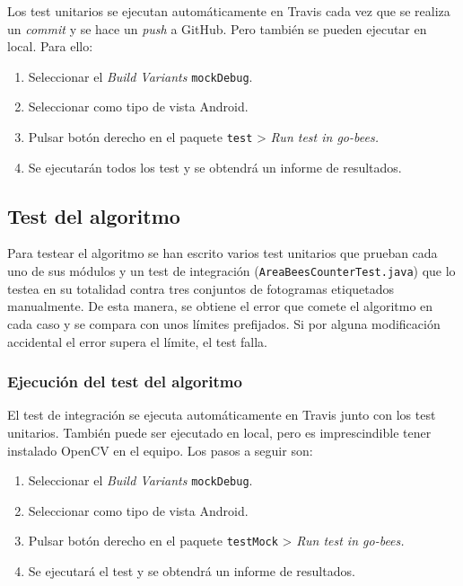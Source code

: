 Los test unitarios se ejecutan automáticamente en Travis cada vez que se
realiza un \emph{commit} y se hace un \emph{push} a GitHub. Pero también
se pueden ejecutar en local. Para ello:

\begin{enumerate}
\def\labelenumi{\arabic{enumi}.}
\tightlist
\item
  Seleccionar el \emph{Build Variants} \texttt{mockDebug}.
\item
  Seleccionar como tipo de vista Android.
\item
  Pulsar botón derecho en el paquete \texttt{test} \textgreater{}
  \emph{Run test in go-bees.}
\item
  Se ejecutarán todos los test y se obtendrá un informe de resultados.
\end{enumerate}


\subsection{Test del algoritmo}\label{test-del-algoritmo}

Para testear el algoritmo se han escrito varios test unitarios que
prueban cada uno de sus módulos y un test de integración
(\texttt{AreaBeesCounterTest.java}) que lo testea en su totalidad contra
tres conjuntos de fotogramas etiquetados manualmente. De esta manera, se
obtiene el error que comete el algoritmo en cada caso y se compara con
unos límites prefijados. Si por alguna modificación accidental el error
supera el límite, el test falla.

\subsubsection{Ejecución del test del
algoritmo}\label{ejecucion-del-test-del-algoritmo}

El test de integración se ejecuta automáticamente en Travis junto con
los test unitarios. También puede ser ejecutado en local, pero es
imprescindible tener instalado OpenCV en el equipo. Los pasos a seguir
son:

\begin{enumerate}
\def\labelenumi{\arabic{enumi}.}
\tightlist
\item
  Seleccionar el \emph{Build Variants} \texttt{mockDebug}.
\item
  Seleccionar como tipo de vista Android.
\item
  Pulsar botón derecho en el paquete \texttt{testMock} \textgreater{}
  \emph{Run test in go-bees.}
\item
  Se ejecutará el test y se obtendrá un informe de resultados.
\end{enumerate}

